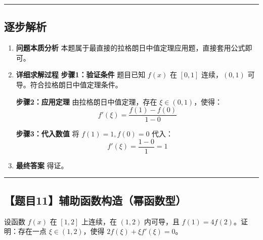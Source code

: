 \documentclass[UTF8]{ctexart}
\newenvironment{redenv}{\color{red}}{}
\newenvironment{detailedanalysis}{%
    \color{red}
    \begin{enumerate}[label=\textbf{第\arabic*步：}, leftmargin=*, align=left, itemsep=1.5ex]
}{%
    \end{enumerate}
}
\newcommand{\problemrule}{\noindent\rule{\textwidth}{1.5pt}\vspace{-0.8em}}
\newcommand{\analysisrule}{\noindent\rule{\textwidth}{0.8pt}\vspace{-0.8em}}
\begin{document}
\begin{redenv}
\analysisrule
\subsection*{逐步解析}

\begin{detailedanalysis}
\item \textbf{问题本质分析}
本题属于最直接的拉格朗日中值定理应用题，直接套用公式即可。

\item \textbf{详细求解过程}
\noindent\textbf{步骤1：验证条件}
题目已知 $f(x)$ 在 $[0, 1]$ 连续，$(0, 1)$ 可导。符合拉格朗日中值定理条件。

\noindent\textbf{步骤2：应用定理}
由拉格朗日中值定理，存在 $\xi \in (0, 1)$，使得：
\[ f'(\xi) = \frac{f(1) - f(0)}{1 - 0} \]

\noindent\textbf{步骤3：代入数值}
将 $f(1)=1, f(0)=0$ 代入：
\[ f'(\xi) = \frac{1 - 0}{1} = 1 \]

\item \textbf{最终答案}
得证。
\end{detailedanalysis}
\end{redenv}

\vspace{2em}
\problemrule
\subsection*{【题目11】辅助函数构造（幂函数型）}
设函数 $f(x)$ 在 $[1, 2]$ 上连续，在 $(1, 2)$ 内可导，且 $f(1) = 4f(2)$。证明：存在一点 $\xi \in (1, 2)$，使得 $2f(\xi) + \xi f'(\xi) = 0$。
\end{document}
